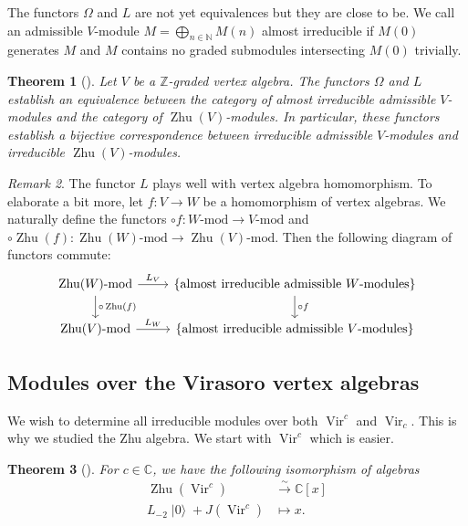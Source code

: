 \documentclass[a4paper, 12pt, reqno]{amsart}
\newtheorem{theorem}{Theorem}[section]
\theoremstyle{remark}
\newtheorem{remark}[theorem]{Remark}
\numberwithin{equation}{subsection}
\DeclareMathOperator{\Vir}{Vir}
\DeclareMathOperator{\vac}{|0\rangle}
\DeclareMathOperator{\Zhu}{Zhu}
\begin{document}
The functors $\Omega$ and $L$ are not yet equivalences but they are close to be.
We call an admissible $V$-module $M = \bigoplus_{n \in \mathbb{N}}M(n)$ almost irreducible if $M(0)$ generates $M$ and $M$ contains no graded submodules intersecting $M(0)$ trivially.

\begin{theorem}[{\cite[\S2]{de_sole_finite_2006}}]
  \label{thr:38}
  Let $V$ be a $\mathbb{Z}$-graded vertex algebra.
  The functors $\Omega$ and $L$ establish an equivalence between the category of almost irreducible admissible $V$-modules and the category of $\Zhu(V)$-modules.
  In particular, these functors establish a bijective correspondence between irreducible admissible $V$-modules and irreducible $\Zhu(V)$-modules.
\end{theorem}

\begin{remark}
  \label{rmk:28}
  The functor $L$ plays well with vertex algebra homomorphism.
  To elaborate a bit more, let $f: V \to W$ be a homomorphism of vertex algebras.
  We naturally define the functors $\circ f: W\text{-mod} \to V\text{-mod}$ and $\circ \Zhu(f): \Zhu(W)\text{-mod} \to \Zhu(V)\text{-mod}$.
  Then the following diagram of functors commute:
  \begin{equation*}
    \begin{tikzcd}
      \Zhu(W)\text{-mod} \arrow[r, "L_V"] \arrow[d, "\circ \Zhu(f)"] & \{\text{almost irreducible admissible $W$-modules}\} \arrow[d, "\circ f"] \\
      \Zhu(V)\text{-mod} \arrow[r, "L_W"]                           & \{\text{almost irreducible admissible $V$-modules}\}                     
    \end{tikzcd}
  \end{equation*}
\end{remark}

\subsection{Modules over the Virasoro vertex algebras}
\label{sec:modul-over-viras}

We wish to determine all irreducible modules over both $\Vir^c$ and $\Vir_c$.
This is why we studied the Zhu algebra.
We start with $\Vir^c$ which is easier.

\begin{theorem}[{\cite{wang_rationality_1993}}]
  \label{thr:39}
  For $c \in \mathbb{C}$, we have the following isomorphism of algebras
  \begin{align*}
    \Zhu(\Vir^c) &\xrightarrow{\sim} \mathbb{C}[x] \\
    L_{-2}\vac + J(\Vir^c) &\mapsto x.
  \end{align*}
\end{theorem}
\end{document}
